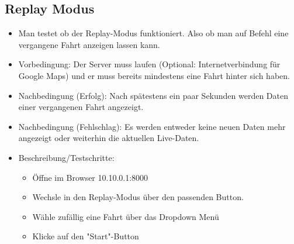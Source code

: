 \documentclass[qualitaetssicherung.tex]{subfiles}
\begin{document}
	\subsection{Replay Modus}
		\begin{itemize}
			\item
			Man testet ob der Replay-Modus funktioniert. Also ob man auf Befehl eine vergangene Fahrt anzeigen lassen kann.
			\item
			Vorbedingung: Der Server muss laufen (Optional: Internetverbindung für Google Maps) und er muss bereits mindestens eine Fahrt hinter sich haben.
			\item
			Nachbedingung (Erfolg): Nach spätestens ein paar Sekunden werden Daten einer vergangenen Fahrt angezeigt.
			\item
			Nachbedingung (Fehlschlag): Es werden entweder keine neuen Daten mehr angezeigt oder weiterhin die aktuellen Live-Daten.
			\item
			Beschreibung/Testschritte:
			\begin{itemize}
				\item
				Öffne im Browser 10.10.0.1:8000
				\item
				Wechsle in den Replay-Modus über den passenden Button.
				\item
				Wähle zufällig eine Fahrt über das Dropdown Menü
				\item
				Klicke auf den "Start"-Button
			\end{itemize}
		\end{itemize}	
\end{document}
